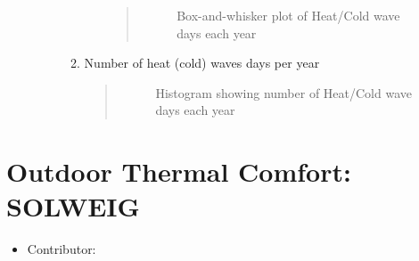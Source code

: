 \documentclass[letterpaper,10pt,english]{sphinxmanual}
\begin{document}
\begin{itemize}
\begin{description}
\begin{enumerate}
\begin{itemize}
\begin{quote}
\begin{figure}[htbp]
\centering
\capstart

\noindent{}
\caption{Box-and-whisker plot of Heat/Cold wave days each year}\label{\detokenize{processor/Outdoor Thermal Comfort ExtremeFinder:id3}}\end{figure}
\end{quote}

\end{itemize}

\item {} 
Number of heat (cold) waves days per year
\begin{quote}

\begin{figure}[htbp]
\centering
\capstart

\noindent{}
\caption{Histogram showing number of Heat/Cold wave days each year}\label{\detokenize{processor/Outdoor Thermal Comfort ExtremeFinder:id4}}\end{figure}
\end{quote}

\end{enumerate}

\end{description}

\end{itemize}


\section{Outdoor Thermal Comfort: SOLWEIG}
\label{\detokenize{processor/Outdoor Thermal Comfort SOLWEIG:outdoor-thermal-comfort-solweig}}\label{\detokenize{processor/Outdoor Thermal Comfort SOLWEIG:solweig}}\label{\detokenize{processor/Outdoor Thermal Comfort SOLWEIG::doc}}\begin{itemize}
\item {} 
Contributor:

\end{itemize}
\end{document}
